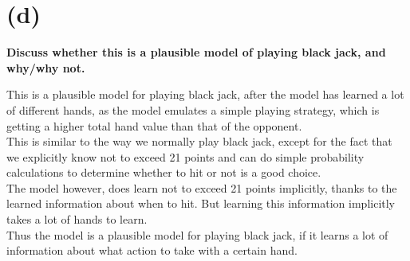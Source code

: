 \documentclass[11pt,a4paper,titlepage]{article}
\begin{document}
\section{(d)}
\label{sec:d}

\textbf{Discuss whether this is a plausible model of playing black
  jack, and why/why not.}

This is a plausible model for playing black jack, after the model has
learned a lot of different hands, as the model emulates a simple
playing strategy, which is getting a higher total hand value
than that of the opponent.\\
This is similar to the way we normally play black jack, except for the
fact that we explicitly know not to exceed 21 points and can do simple
probability calculations to determine whether to hit or not is a good
choice.\\
The model however, does learn not to exceed 21 points implicitly,
thanks to the learned information about when to hit. But learning this
information implicitly takes a lot of hands to learn. \\
Thus the model is a plausible model for playing black jack, if it
learns a lot of information about what action to take with a certain
hand.
\end{document}
